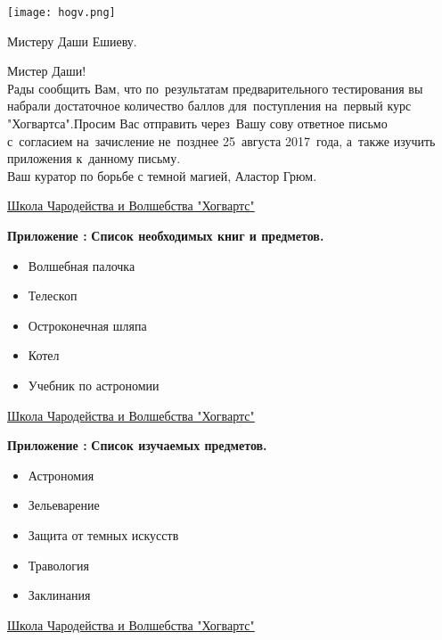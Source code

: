\documentclass[14pt,a4paper, oneside]{report}
\newcounter{i}
\newcommand{\pr}[1]{%
\addtocounter{i}{1}    %
\textbf{\large{Приложение \Asbuk{i}:}}
#1}
\begin{document}
\thispagestyle{empty}
\begin{center}
\texttt{[image: hogv.png]}
\end{center}

\vspace{1cm}

{\fontsize{12}{1.33}\selectfont Мистеру Даши Ешиеву.}

\vspace{2.5cm}

Мистер Даши!
\\

Рады сообщить Вам, что по~результатам предварительного тестирования вы набрали достаточное количество баллов для~поступления на~первый курс "Хогвартса".Просим Вас отправить через~Вашу сову ответное письмо с~согласием на~зачисление не~позднее 25~августа 2017~года, а~также изучить приложения к~данному письму.
\\

Ваш куратор по борьбе с темной магией, Аластор Грюм.
\\ 

{}

\vfill
\begin{center}
\href{http://vhogwarts.ru}{Школа Чародейства и Волшебства "Хогвартс"}
\end{center}
\newpage
\pr{\textbf{\large{Список необходимых книг и предметов.}}}
\begin{itemize}
\item Волшебная палочка
\item Телескоп
\item Остроконечная шляпа
\item Котел
\item Учебник по астрономии
\end{itemize}
\vfill
\begin{center}
\href{http://vhogwarts.ru}{Школа Чародейства и Волшебства "Хогвартс"}
\end{center}
\newpage
\pr{\textbf{\large{Список изучаемых предметов.}}}
\begin{itemize}
\item Астрономия
\item Зельеварение
\item Защита от темных искусств
\item Травология
\item Заклинания
\end{itemize}
\vfill
\begin{center}
\href{http://vhogwarts.ru}{Школа Чародейства и Волшебства "Хогвартс"}
\end{center}
\end{document}
